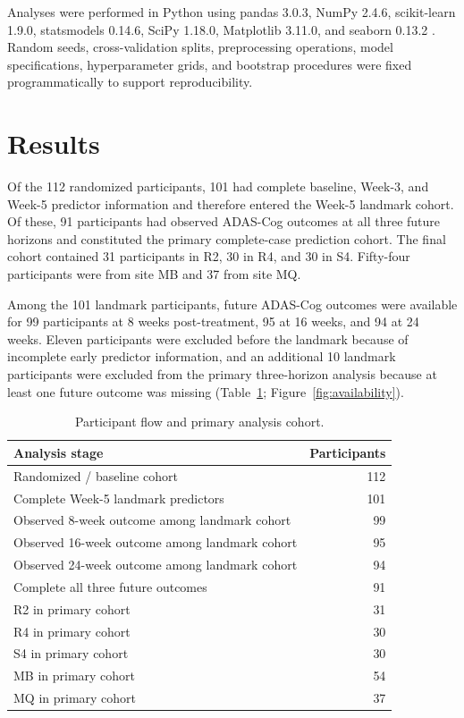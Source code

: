 \documentclass[11pt]{article}
\begin{document}
Analyses were performed in Python using pandas 3.0.3, NumPy 2.4.6,
scikit-learn 1.9.0, statsmodels 0.14.6, SciPy 1.18.0,
Matplotlib 3.11.0, and seaborn 0.13.2
\citep{pedregosa2011scikit,seabold2010statsmodels}.
Random seeds, cross-validation splits, preprocessing operations, model specifications,
hyperparameter grids, and bootstrap procedures were fixed programmatically to support
reproducibility.

\section{Results}

Of the 112 randomized participants, 101 had complete baseline, Week-3,
and Week-5 predictor information and therefore entered the Week-5
landmark cohort. Of these, 91 participants had observed ADAS-Cog outcomes
at all three future horizons and constituted the primary complete-case
prediction cohort. The final cohort contained 31 participants in R2,
30 in R4, and 30 in S4. Fifty-four participants were from site MB and
37 from site MQ.

Among the 101 landmark participants, future ADAS-Cog outcomes were
available for 99 participants at 8 weeks post-treatment, 95 at 16 weeks,
and 94 at 24 weeks. Eleven participants were excluded before the landmark
because of incomplete early predictor information, and an additional
10 landmark participants were excluded from the primary three-horizon
analysis because at least one future outcome was missing
(Table~\ref{tab:cohort-flow}; Figure~\ref{fig:availability}).

\begin{table}[t]
\centering
\caption{Participant flow and primary analysis cohort.}
\label{tab:cohort-flow}
\begin{tabular}{lr}
\toprule
Analysis stage & Participants \\
\midrule
Randomized / baseline cohort & 112 \\
Complete Week-5 landmark predictors & 101 \\
Observed 8-week outcome among landmark cohort & 99 \\
Observed 16-week outcome among landmark cohort & 95 \\
Observed 24-week outcome among landmark cohort & 94 \\
Complete all three future outcomes & 91 \\
\midrule
R2 in primary cohort & 31 \\
R4 in primary cohort & 30 \\
S4 in primary cohort & 30 \\
MB in primary cohort & 54 \\
MQ in primary cohort & 37 \\
\bottomrule
\end{tabular}
\end{table}
\end{document}
